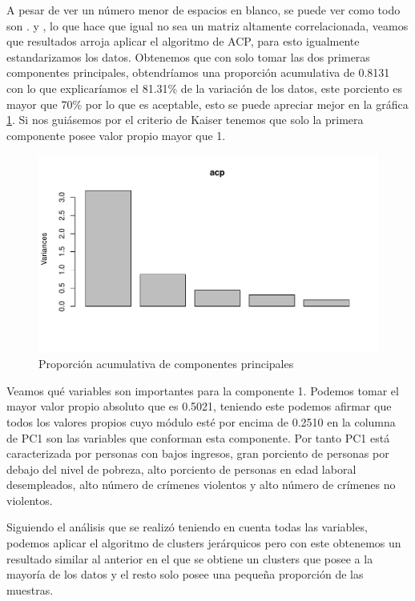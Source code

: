 \documentclass[a4paper,10pt,twocolumn]{article}
\begin{document}
	A pesar de ver un número menor de espacios en blanco, se puede ver como todo son . y , lo que hace que igual no sea un matriz altamente correlacionada, veamos que resultados arroja aplicar el algoritmo de ACP, para esto igualmente estandarizamos los datos. Obtenemos que con solo tomar las dos primeras componentes principales, obtendríamos una proporción acumulativa de 0.8131 con lo que explicaríamos el 81.31\% de la variación de los datos, este porciento es mayor que 70\% por lo que es aceptable, esto se puede apreciar mejor en la gráfica \ref{fig:acp_2}. Si nos guiásemos por el criterio de Kaiser tenemos que solo la primera componente posee valor propio mayor que 1.

	\begin{figure}[htb]
		\begin{center}
			\includegraphics[width=\columnwidth]{figures/acp_2.pdf}
		\end{center}
		\caption{Proporción acumulativa de componentes principales\label{fig:acp_2}}%
	\end{figure}

	Veamos qué variables son importantes para la componente 1. Podemos tomar el mayor valor propio absoluto que es 0.5021, teniendo este podemos afirmar que todos los valores propios cuyo módulo esté por encima de 0.2510 en la columna de PC1 son las variables que conforman esta componente. Por tanto PC1 está caracterizada por personas con bajos ingresos, gran porciento de personas por debajo del nivel de pobreza, alto porciento de personas en edad laboral desempleados, alto número de crímenes violentos y alto número de crímenes no violentos.

	Siguiendo el análisis que se realizó teniendo en cuenta todas las variables, podemos aplicar el algoritmo de clusters jerárquicos pero con este obtenemos un resultado similar al anterior en el que se obtiene un clusters que posee a la mayoría de los datos y el resto solo posee una pequeña proporción de las muestras.
\end{document}
